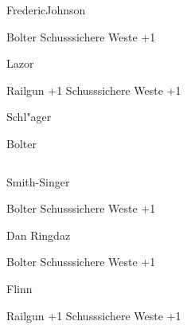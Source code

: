\begin{column}[l]{0.45}
    \begin{nscsheet}[h]{Frederic\newline{}Johnson}
        \nscstats[ATT=2,COM=3]
        \nscruler
        \begin{nscinventory}
            \nscitem[Waffen] Bolter
            \nscitem[R"ustung] Schusssichere Weste +1
        \end{nscinventory}
    \end{nscsheet}

    \begin{nscsheet}[h]{Lazor}
        \nscstats[ATT=3,AGG=2]
        \nscruler
        \begin{nscinventory}
            \nscitem[Waffen] Railgun +1
            \nscitem[R"ustung] Schusssichere Weste +1
        \end{nscinventory}
    \end{nscsheet}


    \begin{nscsheet}[h]{Schl"ager}
        \nscstats[]
        \nscruler
        \begin{nscinventory}
            \nscitem[Waffen] Bolter
        \end{nscinventory}
    \end{nscsheet}    
\end{column}
\begin{column}[r]{0.45}
    \begin{nscsheet}[h]{Smith-Singer}
        \nscstats[ATT=2,AGG=2,DEX=2,COM=3]
        \nscruler
        \begin{nscinventory}
            \nscitem[Waffen] Bolter
            \nscitem[R"ustung] Schusssichere Weste +1
        \end{nscinventory}
    \end{nscsheet}

    \begin{nscsheet}[h]{Dan Ringdaz}
        \nscstats[ATT=2,AGG=2,COM=2]
        \nscruler
        \begin{nscinventory}
            \nscitem[Waffen] Bolter
            \nscitem[R"ustung] Schusssichere Weste +1
        \end{nscinventory}
    \end{nscsheet}

    \begin{nscsheet}[h]{Flinn}
        \nscstats[ATT=2,AGG=]
        \nscruler
        \begin{nscinventory}
            \nscitem[Waffen] Railgun +1
            \nscitem[R"ustung] Schusssichere Weste +1
        \end{nscinventory}
    \end{nscsheet}
\end{column}
\vfill
\pagebreak
